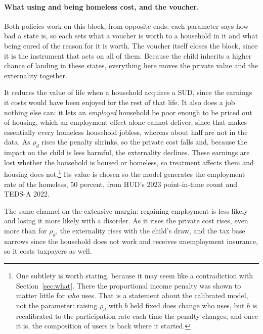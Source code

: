 \documentclass[10pt]{article}
\begin{document}
\paragraph{What using and being homeless cost, and the voucher.} Both
policies work on this block, from opposite ends: each parameter says how bad a state
is, so each sets what a voucher is worth to a household in it and what being cured
of the reason for it is worth. The voucher itself closes the block,
since it is the instrument that acts on all of them. Because the child inherits a higher chance of landing in these
states, everything here moves the private value and the externality together.
\begin{description}\setlength{\itemsep}{0.25em}\setlength{\parskip}{0em}
\item[$\rho_d$, earnings lost to a SUD while still working.] It reduces the value
of life when a household acquires a SUD, since the earnings it costs would have
been enjoyed for the rest of that life. It also does a job nothing else can: it
lets an \emph{employed} household be poor enough to be priced out of housing, which
an employment effect alone cannot deliver, since that makes essentially
every homeless household
jobless, whereas about half are not in the data. As $\rho_d$ rises the penalty shrinks,
so the private cost falls and, because the impact on the child is less
harmful, the externality declines. These earnings are lost whether the
household is housed or homeless, so treatment affects
them and housing does not.\footnote{One subtlety is worth stating, because it may seem like
a contradiction with Section~\ref{sec:what}. There the proportional income penalty
was shown to matter little for \emph{who} uses. That is a statement about the
calibrated model, not the parameter: raising $\rho_d$ with $b$ held fixed does
change who uses, but $b$ is recalibrated to the participation rate each time the
penalty changes, and once it is, the composition of users is back where it started.}
Its value is chosen so the model generates the employment rate of the homeless,
$50$ percent, from HUD's 2023 point-in-time count and TEDS-A 2022.
\item[$\kappa_{ued}$, the employment multiplier for a SUD.] The same channel on the
extensive margin: regaining employment is less likely and losing it more likely with
a disorder. As it rises the private cost rises, even more than for
$\rho_d$, the externality rises
with the child's draw, and the tax base narrows since the household does
not work and receives unemployment insurance, so it costs taxpayers as well.

\end{description}
\end{document}

